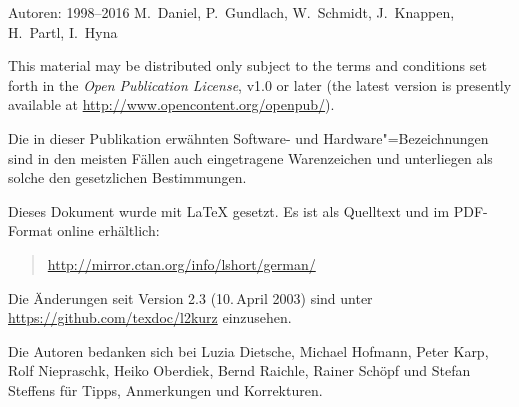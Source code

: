 {\parindent=0cm\thispagestyle{empty}

Autoren: 1998--2016 M.~Daniel, P.~Gundlach, W.~Schmidt, J.~Knappen, H.~Partl, I.~Hyna

\bigskip

{
This material may be distributed only subject to the terms and
conditions set forth in the \emph{Open Publication License}, v1.0 or
later (the latest version is presently available at
\url{http://www.opencontent.org/openpub/}).}


\bigskip

Die in dieser Publikation erwähnten Software- und Hardware"=Bezeichnungen sind
in den meisten Fällen auch eingetragene Warenzeichen und unterliegen als
solche den gesetzlichen Bestimmungen.

\bigskip

\vfill

Dieses Dokument wurde mit \LaTeX{} gesetzt.
Es ist als Quelltext und im PDF-Format online erhältlich:
\begin{quote}
\url{http://mirror.ctan.org/info/lshort/german/}
\end{quote}
Die Änderungen seit Version 2.3 (10.\,April 2003) sind unter \url{https://github.com/texdoc/l2kurz} einzusehen.
\bigskip

Die Autoren bedanken sich bei
Luzia Dietsche,
Michael Hofmann,
Peter Karp,
Rolf \mbox{Niepraschk},
Heiko Oberdiek,
Bernd Raichle,
Rainer Schöpf und
Stefan Steffens
für Tipps, Anmerkungen und  Korrekturen.

}
